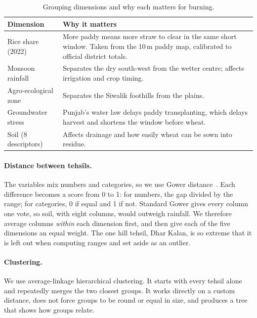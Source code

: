 \documentclass[sigconf,nonacm]{acmart}
\begin{document}
\begin{table}[t]
\caption{Grouping dimensions and why each matters for burning.}
\label{tab:dims}
\small
\begin{tabularx}{\columnwidth}{@{}l >{\raggedright\arraybackslash}X@{}}
\toprule
Dimension & Why it matters \\
\midrule
Rice share (2022) & More paddy means more straw to clear in the same short window. Taken from the 10\,m paddy map, calibrated to official district totals. \\
Monsoon rainfall & Separates the dry south-west from the wetter centre; affects irrigation and crop timing. \\
Agro-ecological zone & Separates the Siwalik foothills from the plains. \\
Groundwater stress & Punjab's water law delays paddy transplanting, which delays harvest and shortens the window before wheat. \\
Soil (8 descriptors) & Affects drainage and how easily wheat can be sown into residue. \\
\bottomrule
\end{tabularx}
\end{table}

\paragraph{Distance between tehsils.} The variables mix numbers and categories, so we use Gower distance~\cite{gower1971}. Each difference becomes a score from 0 to 1: for numbers, the gap divided by the range; for categories, 0 if equal and 1 if not. Standard Gower gives every column one vote, so soil, with eight columns, would outweigh rainfall. We therefore average columns \emph{within} each dimension first, and then give each of the five dimensions an equal weight. The one hill tehsil, Dhar Kalan, is so extreme that it is left out when computing ranges and set aside as an outlier.

\paragraph{Clustering.} We use average-linkage hierarchical clustering. It starts with every tehsil alone and repeatedly merges the two closest groups. It works directly on a custom distance, does not force groups to be round or equal in size, and produces a tree that shows how groups relate.
\end{document}
